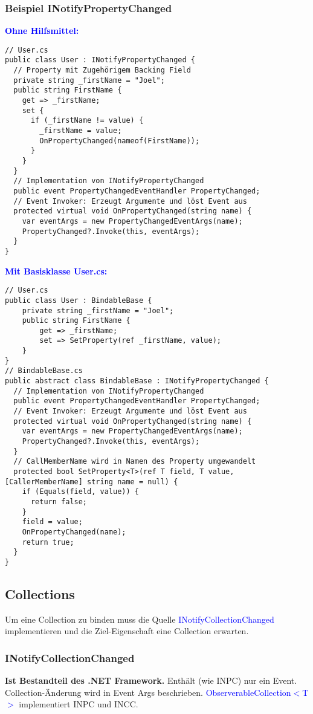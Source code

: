 \subsubsection{Beispiel INotifyPropertyChanged}
\textbf{\textcolor{blue}{Ohne Hilfsmittel:}}
\begin{lstlisting}
// User.cs
public class User : INotifyPropertyChanged {
  // Property mit Zugehörigem Backing Field
  private string _firstName = "Joel";
  public string FirstName {
    get => _firstName;
    set {
      if (_firstName != value) {
        _firstName = value;
        OnPropertyChanged(nameof(FirstName));
      }
    }
  }
  // Implementation von INotifyPropertyChanged
  public event PropertyChangedEventHandler PropertyChanged;
  // Event Invoker: Erzeugt Argumente und löst Event aus
  protected virtual void OnPropertyChanged(string name) {
    var eventArgs = new PropertyChangedEventArgs(name);
    PropertyChanged?.Invoke(this, eventArgs);
  }
}
\end{lstlisting}
\textbf{\textcolor{blue}{Mit Basisklasse User.cs:}}
\begin{lstlisting}
// User.cs
public class User : BindableBase {
    private string _firstName = "Joel";
    public string FirstName {
        get => _firstName;
        set => SetProperty(ref _firstName, value);
    }
}
// BindableBase.cs
public abstract class BindableBase : INotifyPropertyChanged {
  // Implementation von INotifyPropertyChanged
  public event PropertyChangedEventHandler PropertyChanged;
  // Event Invoker: Erzeugt Argumente und löst Event aus
  protected virtual void OnPropertyChanged(string name) {
    var eventArgs = new PropertyChangedEventArgs(name);
    PropertyChanged?.Invoke(this, eventArgs);
  }
  // CallMemberName wird in Namen des Property umgewandelt
  protected bool SetProperty<T>(ref T field, T value, [CallerMemberName] string name = null) {
    if (Equals(field, value)) {
      return false;
    }
    field = value;
    OnPropertyChanged(name);
    return true;
  }
}
\end{lstlisting}
\subsection{Collections}
Um eine Collection zu binden muss die Quelle \textcolor{blue}{INotifyCollectionChanged} implementieren und die Ziel-Eigenschaft eine Collection erwarten.
\subsubsection{INotifyCollectionChanged}
\textbf{Ist Bestandteil des .NET Framework.} Enthält (wie INPC) nur ein Event. Collection-Änderung wird in Event Args beschrieben. \textcolor{blue}{ObserverableCollection$<$T$>$} implementiert INPC und INCC.
